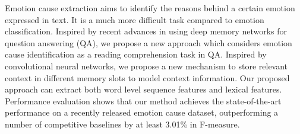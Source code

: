 Emotion cause extraction aims to identify the reasons behind a certain emotion expressed in text. It is a much more difficult task compared to emotion classification. Inspired by recent advances in using deep memory networks for question answering (QA), we propose a new approach which considers emotion cause identification as a reading comprehension task in QA. Inspired by convolutional neural networks, we propose a new mechanism to store relevant context in different memory slots to model context information. Our proposed approach can extract both word level sequence features and lexical features. Performance evaluation shows that our method achieves the state-of-the-art performance on a recently released emotion cause dataset, outperforming a number of competitive baselines by at least 3.01\% in F-measure.
